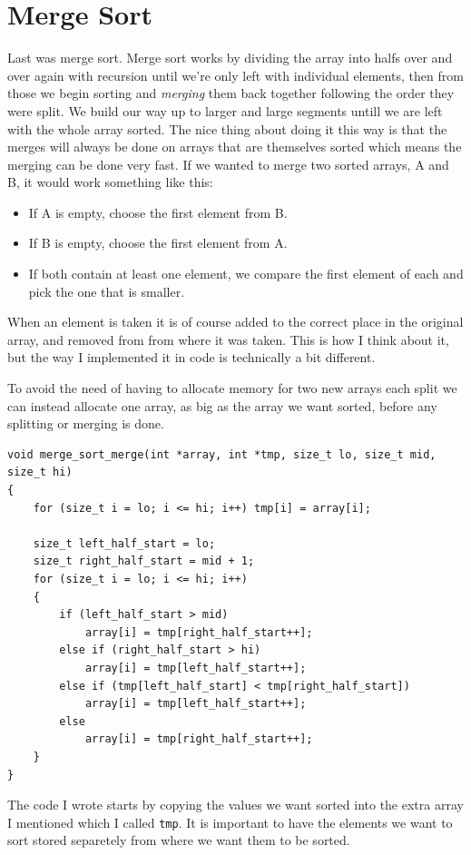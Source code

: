 \documentclass[a4paper, 11pt]{article}
\begin{document}
\section{Merge Sort}
	Last was merge sort.
	Merge sort works by dividing the array into halfs over and over again with recursion until we're only left with individual elements,
	then from those we begin sorting and \textit{merging} them back together following the order they were split.
	We build our way up to larger and large segments untill we are left with the whole array sorted.
	The nice thing about doing it this way is that the merges will always be done on arrays that are themselves sorted which means
	the merging can be done very fast.
	If we wanted to merge two sorted arrays, A and B, it would work something like this:
	\begin{itemize}[label=\textbullet]
		\item If A is empty, choose the first element from B.
		\item If B is empty, choose the first element from A.
		\item If both contain at least one element, we compare the first element of each and pick the one that is smaller.
	\end{itemize}
	When an element is taken it is of course added to the correct place in the original array, and removed from from where it was taken.
	This is how I think about it, but the way I implemented it in code is technically a bit different.
	\par
	To avoid the need of having to allocate memory for two new arrays each split we can instead allocate one array, as big as the array we want sorted,
	before any splitting or merging is done.
	\begin{verbatim}
void merge_sort_merge(int *array, int *tmp, size_t lo, size_t mid, size_t hi)
{
	for (size_t i = lo; i <= hi; i++) tmp[i] = array[i];

	size_t left_half_start = lo;
	size_t right_half_start = mid + 1;
	for (size_t i = lo; i <= hi; i++)
	{
		if (left_half_start > mid)
			array[i] = tmp[right_half_start++];
		else if (right_half_start > hi)
			array[i] = tmp[left_half_start++];
		else if (tmp[left_half_start] < tmp[right_half_start])
			array[i] = tmp[left_half_start++];
		else
			array[i] = tmp[right_half_start++];
	}
}
	\end{verbatim}
	The code I wrote starts by copying the values we want sorted into the extra array I mentioned which I called \texttt{tmp}.
	It is important to have the elements we want to sort stored separetely from where we want them to be sorted.
\end{document}
